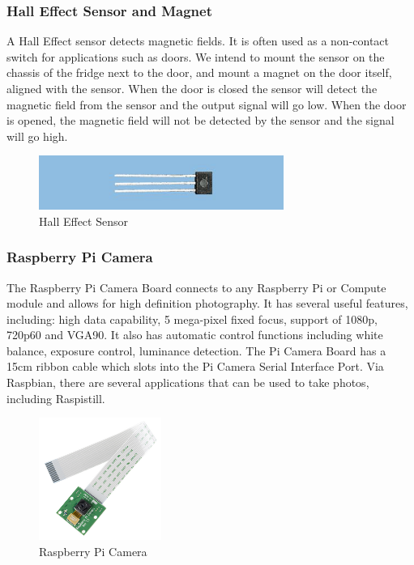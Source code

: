 \documentclass[10pt]{article}
\begin{document}
\subsubsection{Hall Effect Sensor and Magnet}

A Hall Effect sensor detects magnetic fields. It is often used as a non-contact switch for applications such as doors. We intend to mount the sensor on the chassis of the fridge next to the door, and mount a magnet on the door itself, aligned with the sensor. When the door is closed the sensor will detect the magnetic field from the sensor and the output signal will go low. When the door is opened, the magnetic field will not be detected by the sensor and the signal will go high.

\begin{figure}[h]
\centering
\caption{Hall Effect Sensor}
\label{Hall Effect Sensor}
\includegraphics[width=8cm]{images/hall-effect-sensor.jpg}
\end{figure}


\subsubsection{Raspberry Pi Camera}

The Raspberry Pi Camera Board connects to any Raspberry Pi or Compute module and allows for high definition photography. It has several useful features, including: high data capability, 5 mega-pixel fixed focus, support of 1080p, 720p60 and VGA90. It also has automatic control functions including white balance, exposure control, luminance detection.
The Pi Camera Board has a 15cm ribbon cable which slots into the Pi Camera Serial Interface Port. Via Raspbian, there are several applications that can be used to take photos, including Raspistill.

\begin{figure}[h]
\centering
\caption{Raspberry Pi Camera}
\label{Raspberry Pi Camera}
\includegraphics[height=4cm]{images/pi-camera.jpg}
\end{figure}
\end{document}
